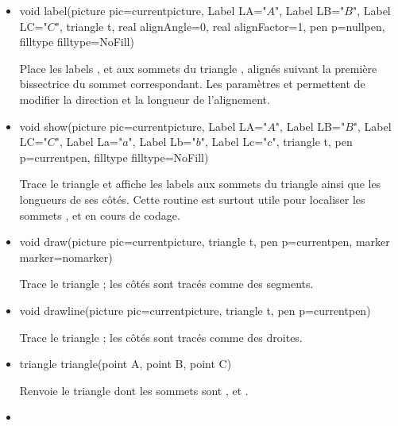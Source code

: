 \documentclass[pdftex]{article}
\begin{document}
\begin{itemize}
\item {}
  \begin{Vcolor}
    void label(picture pic=currentpicture, Label LA="$A$",
    Label LB="$B$", Label LC="$C$",
    triangle t,
    real alignAngle=0,
    real alignFactor=1,
    pen p=nullpen, filltype filltype=NoFill)
  \end{Vcolor}
  Place les labels ,  et  aux
  sommets du triangle , alignés suivant la première bissectrice
  du sommet correspondant. Les paramètres 
  et  permettent de modifier la direction et la
  longueur de l'alignement.
\item {}
  \begin{Vcolor}
    void show(picture pic=currentpicture,
    Label LA="$A$", Label LB="$B$", Label LC="$C$",
    Label La="$a$", Label Lb="$b$", Label Lc="$c$",
    triangle t, pen p=currentpen, filltype filltype=NoFill)
  \end{Vcolor}
  Trace le triangle  et affiche les labels aux sommets du triangle ainsi que les
  longueurs de ses côtés. Cette routine est surtout utile pour
  localiser les sommets ,  et  en
  cours de codage.
\item {}
  \begin{Vcolor}
    void draw(picture pic=currentpicture, triangle t,
    pen p=currentpen, marker marker=nomarker)
  \end{Vcolor}
  Trace le triangle ; les côtés sont tracés comme des segments.
\item {}
  \begin{Vcolor}
    void drawline(picture pic=currentpicture, triangle t, pen p=currentpen)
  \end{Vcolor}
  Trace le triangle ; les côtés sont tracés comme des droites.
\item {}
  \begin{Vcolor}
    triangle triangle(point A, point B, point C)
  \end{Vcolor}
  Renvoie le triangle dont les sommets sont ,  et .
\item {}
  \begin{Vcolor}

\end{Vcolor}
\end{itemize}
\end{document}
